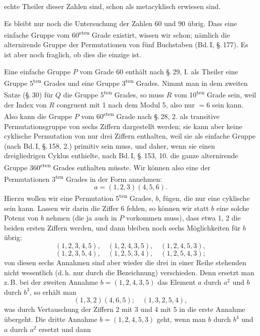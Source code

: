 echte Theiler dieser Zahlen sind, schon als metacyklisch erwiesen sind.

Es bleibt nur noch die Untersuchung der Zahlen 60 und 90 übrig. Dass eine einfache Gruppe vom 60\textsuperscript{sten} Grade existirt, wissen wir schon; nämlich die alternirende Gruppe der Permutationen von fünf Buchstaben (Bd.\,I, \S.\,177). Es ist aber noch fraglich, ob dies die einzige ist.

Eine einfache Gruppe $P$ vom Grade 60 enthält nach \S.\,29, I. als Theiler eine Gruppe 5\textsuperscript{ten} Grades und eine Gruppe 3\textsuperscript{ten} Grades. Nimmt man in dem zweiten  Satze (\S.\,30) für $Q$ die Gruppe 5\textsuperscript{ten} Grades, so muss $R$ vom 10\textsuperscript{ten} Grade sein, weil der Index von $R$ congruent mit 1 nach dem Modul 5, also nur $= 6$ sein kann. Also kann die Gruppe $P$ vom 60\textsuperscript{sten} Grade nach \S.\,28, 2. als transitive Permutationsgruppe von sechs Ziffern dargestellt werden; sie kann aber keine cyklische Permutation von nur drei Ziffern enthalten, weil sie als einfache Gruppe (nach Bd.\,I, \S.\,158, 2.) primitiv sein muss, und daher, wenn sie einen dreigliedrigen Cyklus enthielte, nach Bd.\,I, \S.\,153, 10. die ganze alternirende Gruppe 360\textsuperscript{sten} Grades enthalten müsste. Wir können also eine der Permutationen 3\textsuperscript{ten} Grades in der Form annehmen:
\[
a = (1, 2, 3) (4, 5, 6).
\]
Hierzu wollen wir eine Permutation 5\textsuperscript{ten} Grades, $b$, fügen, die nur eine cyklische sein kann. Lassen wir darin die Ziffer 6 fehlen, so können wir statt $b$ eine solche Potenz von $b$ nehmen (die ja auch in $P$ vorkommen muss), dass etwa 1, 2 die beiden ersten Ziffern werden, und dann bleiben noch sechs Möglichkeiten für $b$ übrig:
\[
(1, 2, 3, 4, 5), \quad (1, 2, 4, 3, 5), \quad (1, 2, 4, 5, 3),
\]
\[
(1, 2, 3, 5, 4), \quad (1, 2, 5, 3, 4), \quad (1, 2, 5, 4, 3);
\]
von diesen sechs Annahmen sind aber wieder die drei in einer Reihe stehenden nicht wesentlich (d.\,h. nur durch die Bezeichnung) verschieden. Denn ersetzt man z.\,B. bei der zweiten Annahme $b = (1, 2, 4, 3, 5)$ das Element $a$ durch $a^2$ und $b$ durch $b^3$, so erhält man
\[
(1, 3, 2) (4, 6, 5); \quad (1, 3, 2, 5, 4),
\]
was durch Vertauschung der Ziffern 2 mit 3 und 4 mit 5 in die erste Annahme übergeht. Die dritte Annahme $b = (1, 2, 4, 5, 3)$ geht, wenn man $b$ durch $b^4$ und $a$ durch $a^2$ ersetzt und dann

